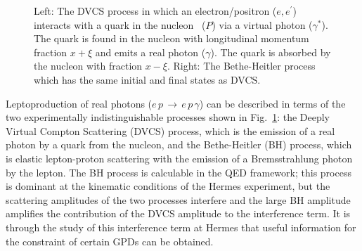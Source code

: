 \begin{figure}
\begin{center}
\hspace{3cm}
\caption[DVCS and Bethe Heitler hand bag diagram.]{Left: The DVCS process in
which an electron/positron ($e,e^\prime$) interacts with a quark in the nucleon \ ($P$) via a virtual photon ($\gamma^\ast$). The quark is found in the nucleon with longitudinal momentum fraction $x+\xi$ and emits a real photon ($\gamma$). The quark is absorbed by the nucleon with fraction $x-\xi$. Right: The Bethe-Heitler process which has the same initial and final states as DVCS.}
\label{spin}
\end{center}
\end{figure}

Leptoproduction of real photons ($e\,p\,\rightarrow\,e\,p\,\gamma$) can be described in terms of the two experimentally indistinguishable processes shown in Fig.~\ref{spin}: the Deeply Virtual Compton Scattering (DVCS) process, which is the
emission of a real photon by a quark from the nucleon, and the Bethe-Heitler (BH) process, which is elastic lepton-proton scattering with the
emission of a Bremsstrahlung photon by the lepton. 
The BH process is calculable in the QED framework; this process is
dominant at the kinematic conditions of the H{\sc ermes} experiment, but the
scattering amplitudes of the two processes interfere and the large BH amplitude
amplifies the contribution of the DVCS amplitude to the interference term. 
It is through the study of this interference term at H{\sc ermes} that
useful information for the constraint of certain GPDs can be obtained.

